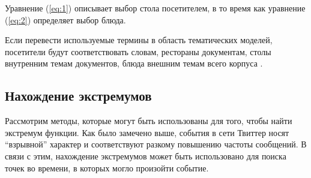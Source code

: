 \documentclass[12pt, a4paper]{article}
\begin{document}
  Уравнение (\ref{eq:1}) описывает выбор стола посетителем, в то время как уравнение (\ref{eq:2}) определяет выбор блюда.
  
  Если перевести используемые термины в область тематических моделей, посетители будут соответствовать словам, рестораны документам, столы внутренним темам документов, блюда внешним темам всего корпуса \cite{hdp-1}.
  
	\subsection{Нахождение экстремумов}
	\label{maxima-detection-subsection}
	Рассмотрим методы, которые могут быть использованы для того, чтобы найти экстремум функции. Как было замечено выше, события в сети Твиттер носят ``взрывной'' характер и соответствуют разкому повышению частоты сообщений. В связи с этим, нахождение экстремумов может быть использовано для поиска точек во времени, в которых могло произойти событие.
	
\end{document}
